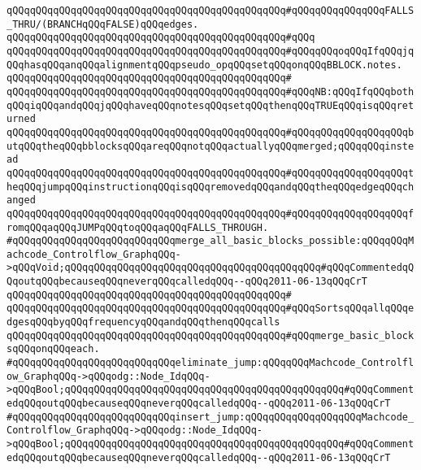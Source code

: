 \verb|qQQqqQQqqQQqqQQqqQQqqQQqqQQqqQQqqQQqqQQqqQQqqQQq#qQQqqQQqqQQqqQQqFALLS_THRU/(BRANCHqQQqFALSE)qQQqedges.|\newline
\verb|qQQqqQQqqQQqqQQqqQQqqQQqqQQqqQQqqQQqqQQqqQQqqQQq#qQQq|\newline
\verb|qQQqqQQqqQQqqQQqqQQqqQQqqQQqqQQqqQQqqQQqqQQqqQQq#qQQqqQQqoqQQqIfqQQqjqQQqhasqQQqanqQQqalignmentqQQqpseudo_opqQQqsetqQQqonqQQqBBLOCK.notes.|\newline
\verb|qQQqqQQqqQQqqQQqqQQqqQQqqQQqqQQqqQQqqQQqqQQqqQQq#|\newline
\verb|qQQqqQQqqQQqqQQqqQQqqQQqqQQqqQQqqQQqqQQqqQQqqQQq#qQQqNB:qQQqIfqQQqbothqQQqiqQQqandqQQqjqQQqhaveqQQqnotesqQQqsetqQQqthenqQQqTRUEqQQqisqQQqreturned|\newline
\verb|qQQqqQQqqQQqqQQqqQQqqQQqqQQqqQQqqQQqqQQqqQQqqQQq#qQQqqQQqqQQqqQQqqQQqbutqQQqtheqQQqbblocksqQQqareqQQqnotqQQqactuallyqQQqmerged;qQQqqQQqinstead|\newline
\verb|qQQqqQQqqQQqqQQqqQQqqQQqqQQqqQQqqQQqqQQqqQQqqQQq#qQQqqQQqqQQqqQQqqQQqtheqQQqjumpqQQqinstructionqQQqisqQQqremovedqQQqandqQQqtheqQQqedgeqQQqchanged|\newline
\verb|qQQqqQQqqQQqqQQqqQQqqQQqqQQqqQQqqQQqqQQqqQQqqQQq#qQQqqQQqqQQqqQQqqQQqfromqQQqaqQQqJUMPqQQqtoqQQqaqQQqFALLS_THROUGH.|\newline
\newline
\verb|#qQQqqQQqqQQqqQQqqQQqqQQqqQQqmerge_all_basic_blocks_possible:qQQqqQQqMachcode_Controlflow_GraphqQQq->qQQqVoid;qQQqqQQqqQQqqQQqqQQqqQQqqQQqqQQqqQQqqQQqqQQq#qQQqCommentedqQQqoutqQQqbecauseqQQqneverqQQqcalledqQQq--qQQq2011-06-13qQQqCrT|\newline
\verb|qQQqqQQqqQQqqQQqqQQqqQQqqQQqqQQqqQQqqQQqqQQqqQQq#|\newline
\verb|qQQqqQQqqQQqqQQqqQQqqQQqqQQqqQQqqQQqqQQqqQQqqQQq#qQQqSortsqQQqallqQQqedgesqQQqbyqQQqfrequencyqQQqandqQQqthenqQQqcalls|\newline
\verb|qQQqqQQqqQQqqQQqqQQqqQQqqQQqqQQqqQQqqQQqqQQqqQQq#qQQqmerge_basic_blocksqQQqonqQQqeach.|\newline
\newline
\verb|#qQQqqQQqqQQqqQQqqQQqqQQqqQQqeliminate_jump:qQQqqQQqMachcode_Controlflow_GraphqQQq->qQQqodg::Node_IdqQQq->qQQqBool;qQQqqQQqqQQqqQQqqQQqqQQqqQQqqQQqqQQqqQQqqQQqqQQq#qQQqCommentedqQQqoutqQQqbecauseqQQqneverqQQqcalledqQQq--qQQq2011-06-13qQQqCrT|\newline
\verb|#qQQqqQQqqQQqqQQqqQQqqQQqqQQqinsert_jump:qQQqqQQqqQQqqQQqqQQqMachcode_Controlflow_GraphqQQq->qQQqodg::Node_IdqQQq->qQQqBool;qQQqqQQqqQQqqQQqqQQqqQQqqQQqqQQqqQQqqQQqqQQqqQQq#qQQqCommentedqQQqoutqQQqbecauseqQQqneverqQQqcalledqQQq--qQQq2011-06-13qQQqCrT|\newline
